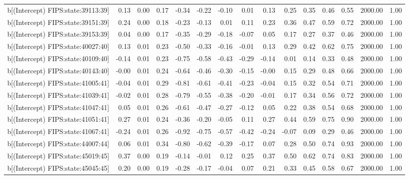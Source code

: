 \begin{table}[ht]
\begin{tabular}{rrrrrrrrrrrrrrr}
  b[(Intercept) FIPS:state:39113:39] & 0.13 & 0.00 & 0.17 & -0.34 & -0.22 & -0.10 & 0.01 & 0.13 & 0.25 & 0.35 & 0.46 & 0.55 & 2000.00 & 1.00 \\ 
  b[(Intercept) FIPS:state:39151:39] & 0.24 & 0.00 & 0.18 & -0.23 & -0.13 & 0.01 & 0.11 & 0.23 & 0.36 & 0.47 & 0.59 & 0.72 & 2000.00 & 1.00 \\ 
  b[(Intercept) FIPS:state:39153:39] & 0.04 & 0.00 & 0.17 & -0.35 & -0.29 & -0.18 & -0.07 & 0.05 & 0.17 & 0.27 & 0.37 & 0.46 & 2000.00 & 1.00 \\ 
  b[(Intercept) FIPS:state:40027:40] & 0.13 & 0.01 & 0.23 & -0.50 & -0.33 & -0.16 & -0.01 & 0.13 & 0.29 & 0.42 & 0.62 & 0.75 & 2000.00 & 1.00 \\ 
  b[(Intercept) FIPS:state:40109:40] & -0.14 & 0.01 & 0.23 & -0.75 & -0.58 & -0.43 & -0.29 & -0.14 & 0.01 & 0.14 & 0.33 & 0.48 & 2000.00 & 1.00 \\ 
  b[(Intercept) FIPS:state:40143:40] & -0.00 & 0.01 & 0.24 & -0.64 & -0.46 & -0.30 & -0.15 & -0.00 & 0.15 & 0.29 & 0.48 & 0.66 & 2000.00 & 1.00 \\ 
  b[(Intercept) FIPS:state:41005:41] & -0.04 & 0.01 & 0.29 & -0.81 & -0.61 & -0.41 & -0.23 & -0.04 & 0.15 & 0.32 & 0.54 & 0.71 & 2000.00 & 1.00 \\ 
  b[(Intercept) FIPS:state:41039:41] & -0.02 & 0.01 & 0.28 & -0.79 & -0.55 & -0.38 & -0.20 & -0.01 & 0.17 & 0.34 & 0.56 & 0.72 & 2000.00 & 1.00 \\ 
  b[(Intercept) FIPS:state:41047:41] & 0.05 & 0.01 & 0.26 & -0.61 & -0.47 & -0.27 & -0.12 & 0.05 & 0.22 & 0.38 & 0.54 & 0.68 & 2000.00 & 1.00 \\ 
  b[(Intercept) FIPS:state:41051:41] & 0.27 & 0.01 & 0.24 & -0.36 & -0.20 & -0.05 & 0.11 & 0.27 & 0.44 & 0.59 & 0.75 & 0.90 & 2000.00 & 1.00 \\ 
  b[(Intercept) FIPS:state:41067:41] & -0.24 & 0.01 & 0.26 & -0.92 & -0.75 & -0.57 & -0.42 & -0.24 & -0.07 & 0.09 & 0.29 & 0.46 & 2000.00 & 1.00 \\ 
  b[(Intercept) FIPS:state:44007:44] & 0.06 & 0.01 & 0.34 & -0.80 & -0.62 & -0.39 & -0.17 & 0.07 & 0.28 & 0.50 & 0.74 & 0.93 & 2000.00 & 1.00 \\ 
  b[(Intercept) FIPS:state:45019:45] & 0.37 & 0.00 & 0.19 & -0.14 & -0.01 & 0.12 & 0.25 & 0.37 & 0.50 & 0.62 & 0.74 & 0.83 & 2000.00 & 1.00 \\ 
  b[(Intercept) FIPS:state:45045:45] & 0.20 & 0.00 & 0.19 & -0.28 & -0.17 & -0.04 & 0.07 & 0.21 & 0.33 & 0.45 & 0.58 & 0.67 & 2000.00 & 1.00 \\ 

\end{tabular}
\end{table}
